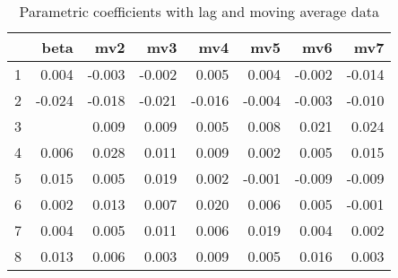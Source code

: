 \documentclass[a4paper, 12pt]{article}
\begin{document}
\begin{table}[h]
\centering
\caption{Parametric coefficients with lag and moving average data}
\begin{tabular}{rrrrrrrr}
  \hline
 & beta & mv2 & mv3 & mv4 & mv5 & mv6 & mv7 \\
  \hline
1 & 0.004 & -0.003 & -0.002 & 0.005 & 0.004 & -0.002 & -0.014 \\
  2 & -0.024 & -0.018 & -0.021 & -0.016 & -0.004 & -0.003 & -0.010 \\
  3 & \color{red}{0.032} & 0.009 & 0.009 & 0.005 & 0.008 & 0.021 & 0.024 \\
  4 & 0.006 & 0.028 & 0.011 & 0.009 & 0.002 & 0.005 & 0.015 \\
  5 & 0.015 & 0.005 & 0.019 & 0.002 & -0.001 & -0.009 & -0.009 \\
  6 & 0.002 & 0.013 & 0.007 & 0.020 & 0.006 & 0.005 & -0.001 \\
  7 & 0.004 & 0.005 & 0.011 & 0.006 & 0.019 & 0.004 & 0.002 \\
  8 & 0.013 & 0.006 & 0.003 & 0.009 & 0.005 & 0.016 & 0.003 \\
   \hline
\end{tabular}
\end{table}
\clearpage
\end{document}
